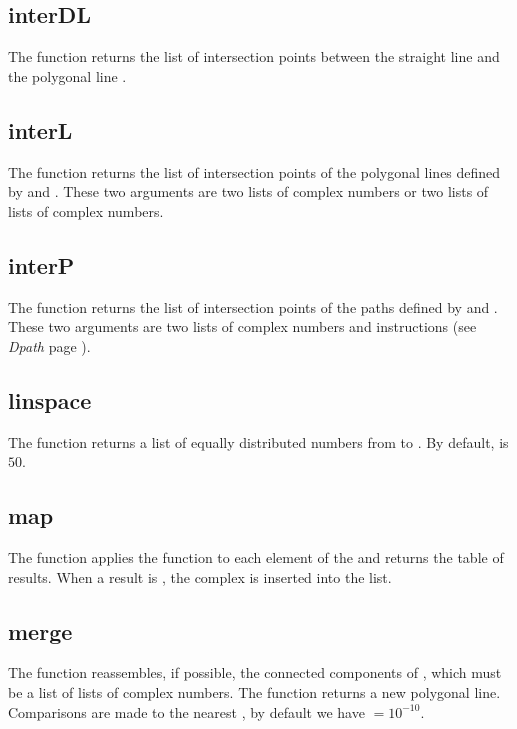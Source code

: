 \subsection{interDL}

The function  returns the list of intersection points between the straight line  and the polygonal line .

\subsection{interL}

The function  returns the list of intersection points of the polygonal lines defined by  and . These two arguments are two lists of complex numbers or two lists of lists of complex numbers.

\subsection{interP}

The function  returns the list of intersection points of the paths defined by  and . These two arguments are two lists of complex numbers and instructions (see \emph{Dpath} page \pageref{Dpath}).


\subsection{linspace}

The function  returns a list of  equally distributed numbers from  to . By default,  is $50$.

\subsection{map}

The function  applies the function  to each element of the  and returns the table of results. When a result is \nil, the complex  is inserted into the list.

\subsection{merge}

The function  reassembles, if possible, the connected components of , which must be a list of lists of complex numbers. The function returns a new polygonal line. Comparisons are made to the nearest , by default we have $=10^{-10}$.

